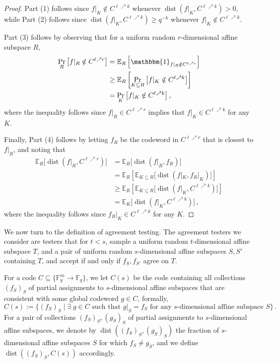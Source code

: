 \documentclass[11pt]{article}
\numberwithin{equation}{section}
\theoremstyle{definition}
\theoremstyle{plain}
\theoremstyle{plain}
\DeclareMathOperator{\dist}{dist} %
\newcommand{\E}{{\mathbb{E}}}
\newcommand{\F}{{\mathbb{F}}}
\begin{document}
\begin{proof}
Part (1) follows since $f|_K \notin C^{\ell \nearrow k}$ whenever $\dist(f|_K, C^{\ell \nearrow k})>0$, while Part (2) follows since $\dist(f|_K, C^{\ell \nearrow k}) \geq q^{-k}$ whenever $f|_K \notin C^{\ell \nearrow k}$.

Part (3) follows by observing that for a uniform random $r$-dimensional affine subspace $R$,
\begin{align*}
\Pr_R\big[f|_R \notin C^{\ell \nearrow r}\big] & =  \E_R\left[\mathbbm{1}_{f|_R \notin C^{\ell \nearrow r}}\right] \\
 & \geq  \E_R \left[  \Pr_{K\subseteq R} \big[  f|_K \notin C^{\ell \nearrow k} \big]\right] \\
 & =  \Pr_K\big[f|_K \notin C^{\ell \nearrow k}\big]\,,
\end{align*}
where the inequality follows since $f|_R \in C^{\ell \nearrow r}$ implies that $ f|_K \in C^{\ell \nearrow k}$ for any $K$.

Finally, Part (4) follows by letting $f_R$ be the codeword in $C^{\ell \nearrow r}$ that is closest to $f|_R$, and noting that
\begin{align*}
  \E_R\big[\dist(f|_R, C^{\ell \nearrow r})\big]
  & =  \E_R\big[\dist(f|_R, f_R)\big] \\
& =  \E_R \left[ \E_{ K \subseteq R}\big[\dist(f|_K, f_R|_K)\big]\right] \\
 & \geq  \E_R \left[ \E_{ K \subseteq R}\big[\dist(f|_K, C^{\ell \nearrow k})\big]\right] \\
 & =  \E_K\big[\dist(f|_K, C^{\ell \nearrow k})\big]\,,
\end{align*}
where the inequality follows since $f_R|_K \in C^{\ell \nearrow k}$ for any $K$.
\end{proof}

We now turn to the definition of agreement testing. The agreement testers we consider are testers that for $t<s$, sample a uniform random $t$-dimensional affine subspace $T$, and a pair of uniform random $s$-dimensional affine subspaces $S,S'$ containing $T$, and accept if and only if $f_S, f_{S'}$ agree on $T$.

For a code $C \subseteq \{\F_q^m \to \F_q\}$, we let $C(s)$ be the code containing all collections $(f_S)_S$ of partial assignments to $s$-dimensional affine subspaces  that are consistent with some global codeword $g \in C$, formally,
\[ C(s):=\big\{ (f_S)_S \mid \text{$\exists \; g \in C$ such that  $g|_S = f_S$ for any $s$-dimensional affine subspace $S$}  \big\}\,. \]
For a pair of collections $(f_S)_S, (g_S)_S$ of partial assignments to $s$-dimensional affine subspaces,  we denote by $\dist((f_S)_S, (g_S)_S)$ the fraction of $s$-dimensional affine subspaces $S$ for which $f_S \neq g_S$, and we define $\dist((f_S)_S, C(s))$ accordingly.
\end{document}
